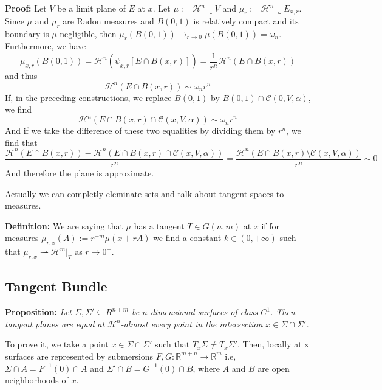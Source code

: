 \documentclass{article}
\begin{document}
\vspace{1ex}
\textbf{Proof:} Let $V$ be a limit plane of $E$ at $x$. Let $\mu:= \mathcal{H}^n
\,\llcorner V$ and $\mu_r:=\mathcal{H}^n\,\llcorner E_{x,r}$. Since $\mu$ and
$\mu_r$ are Radon measures and $B(0,1)$ is relatively compact and its boundary
is $\mu$-negligible, then $\mu_r(B(0,1)) \rightarrow_{r\rightarrow 0}
\mu(B(0,1)) = \omega_n$. Furthermore, we have
\[\mu_{x,r}(B(0,1)) = \mathcal{H}^n(\psi_{x,r}[E\cap B(x, r)]) = \frac{1}{r^n}\mathcal{H}^n(E\cap B(x, r))\]
and thus
\[\mathcal{H}^n(E\cap B(x, r)) \sim \omega_n r^n\]
If, in the preceding constructions, we replace $B(0,1)$ by $B(0,1)\cap\mathcal{C}
(0,V,\alpha)$, we find
\[\mathcal{H}^n(E\cap B(x, r)\cap\mathcal{C}(x,V,\alpha)) \sim \omega_n r^n\]
And if we take the difference of these two equalities by dividing them by $r^n$,
we find that
\[\frac{\mathcal{H}^n(E\cap B(x, r)) - \mathcal{H}^n(E\cap B(x, r)\cap\mathcal{C}(x,V,\alpha))}{r^n} = \frac{\mathcal{H}^n(E\cap B(x, r)\setminus\mathcal{C}(x,V,\alpha))}{r^n} \sim 0\]
And therefore the plane is approximate.

\vspace{2ex}
Actually we can completly eleminate sets and talk about tangent spaces to
measures.

\vspace{1ex}
\textbf{Definition:} We are saying that $\mu$ has a tangent $T\in G(n,m)$ at $x$ if
for measures $\mu_{r,x}(A):=r^{-m}\mu(x+rA)$ we find a constant $k\in(0,+\infty)$
such that $\mu_{r,x}\rightharpoonup \mathcal H^m|_T$ as $r\rightarrow 0^+$.

\subsection{Tangent Bundle}
\textbf{Proposition:} \textit{Let $\Sigma, \Sigma′\subseteq R^{n+m}$ be
$n$-dimensional surfaces of class $C^1$. Then tangent planes are equal at 
$\mathcal H^n$-almost every point in the intersection $x∈\Sigma\cap\Sigma′$.}

\vspace{1ex}
To prove it, we take a point $x\in\Sigma\cap\Sigma'$ such that $T_x\Sigma\neq T_x
\Sigma'$. Then, locally at x surfaces are represented by submersions $F,G:\mathbb
R^{m+n}\rightarrow\mathbb R^m$ i.e, $\Sigma\cap A=F^{-1}(0)\cap A$ and
$\Sigma'\cap B=G^{-1}(0)\cap B$, where $A$ and $B$ are open neighborhoods of $x$.
\end{document}
